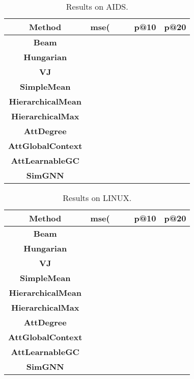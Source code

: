 \documentclass[sigconf]{acmart}
\begin{document}
\begin{table}
\footnotesize
\centering
\vspace{-0.05in}
\caption{Results on AIDS.}
\vspace{-0.05in}
\begin{tabular}{|c|ccccc|} \hline
\textbf{Method} & \textbf{mse(} & \textbf{} & \textbf{}&\textbf{p@10} & \textbf{p@20} \\ \hline\hline
\textbf{Beam} &  &  &  &  &  \\
\textbf{Hungarian} &  &  & &  &  \\
\textbf{VJ}  &  &  &  & &  \\ \hline\hline
\textbf{SimpleMean} &  &   &  &  &   \\
\textbf{HierarchicalMean} &  &   &  &  &  \\
\textbf{HierarchicalMax} &  &   & &  &  \\
\textbf{AttDegree} &  &  &  &  &   \\
\textbf{AttGlobalContext} &  & &  &  &   \\
\textbf{AttLearnableGC} &  &  &  &   &   \\ \hline\hline
\textbf{SimGNN} &  &  &  &  &  \\ \hline
\end{tabular}
\centering
\label{aids_results}
\end{table}

\begin{table}
\footnotesize
\centering
\vspace{-0.05in}
\caption{Results on LINUX.}
\vspace{-0.05in}
\begin{tabular}{|c|ccccc|} \hline
\textbf{Method} & \textbf{mse(} & \textbf{} & \textbf{} &  \textbf{p@10} & \textbf{p@20} \\ \hline\hline
\textbf{Beam} &  &  &   &  &  \\
\textbf{Hungarian} &  &  &  &  &  \\
\textbf{VJ} &  &   &   &  &  \\ \hline\hline
\textbf{SimpleMean} &  &  &  &  &   \\
\textbf{HierarchicalMean} &  &   &  &  &  \\
\textbf{HierarchicalMax}  &  &  &  &  &  \\
\textbf{AttDegree} &  &   &  &  &  \\
\textbf{AttGlobalContext} &  &  &  &  &   \\
\textbf{AttLearnableGC} &  &  &  &  &   \\ \hline\hline
\textbf{SimGNN} &  &  &  &  &  \\ \hline
\end{tabular}
\centering
\label{linux_results}
\end{table}
\end{document}
